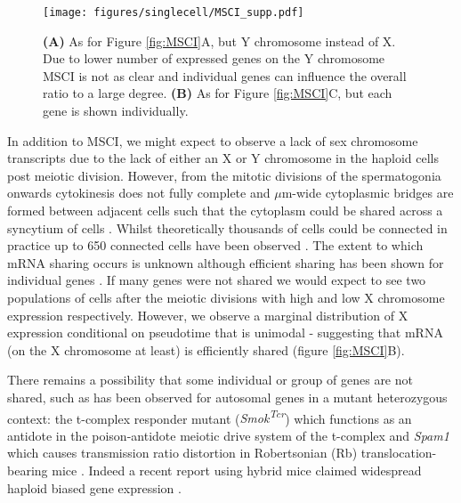\begin{figure}[H]
	\centering
	\texttt{[image: figures/singlecell/MSCI\_supp.pdf]}
	\caption[MSCI Supplement]{
		\textbf{(A)} As for Figure \ref{fig:MSCI}A, but Y chromosome instead of X.
			Due to lower number of expressed genes on the Y chromosome MSCI is not as clear and individual genes can influence the overall ratio to a large degree.
		\textbf{(B)} As for Figure \ref{fig:MSCI}C, but each gene is shown individually.}
	\label{fig:MSCI_supp}
\end{figure}


In addition to MSCI, we might expect to observe a lack of sex chromosome transcripts due to the lack of either an X or Y chromosome in the haploid cells post meiotic division.
However, from the mitotic divisions of the spermatogonia onwards cytokinesis does not fully complete and $\mu$m-wide cytoplasmic bridges are formed between adjacent cells such that the cytoplasm could be shared across a syncytium of cells \parencite{Greenbaum2011Germ}.
Whilst theoretically thousands of cells could be connected in practice up to 650 connected cells have been observed \parencite{Ren1991Clonal}.
The extent to which mRNA sharing occurs is unknown although efficient sharing has been shown for individual genes \parencite{Braun1989Genetically}.
If many genes were not shared we would expect to see two populations of cells after the meiotic divisions with high and low X chromosome expression respectively.
However, we observe a marginal distribution of X expression conditional on pseudotime that is unimodal - suggesting that mRNA (on the X chromosome at least) is efficiently shared (figure \ref{fig:MSCI}B).

There remains a possibility that some individual or group of genes are not shared, such as has been observed for autosomal genes in a mutant heterozygous context: the t-complex responder mutant (\textit{Smok\textsuperscript{Tcr}}) which functions as an antidote in the poison-antidote meiotic drive system of the t-complex \parencite{Herrmann1999protein, Veron2009Retention} and \textit{Spam1} which causes transmission ratio distortion in Robertsonian (Rb) translocation-bearing mice \parencite{Martin-DeLeon2005Spam1associated}.
Indeed a recent report using hybrid mice claimed widespread haploid biased gene expression \parencite{Bhutani2019Widespread}.


